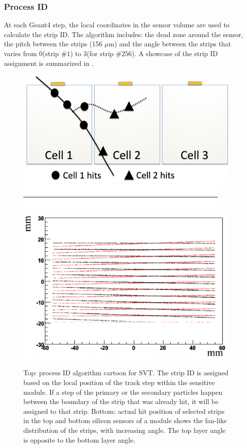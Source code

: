 \subsubsection{Process ID}

At each Geant4 step, the local coordinates in the sensor volume are used to calculate the strip ID.
The algorithm includes: the dead zone around the sensor, the pitch between the strips (156 $\mu$m) and the angle
between the strips that varies from 0\mdeg (strip $\# 1$) to 3\mdeg (for strip  $\# 256$). A showcase of the strip ID assignment
is summarized in .

\begin{figure}
	\centering
	\includegraphics[width=0.99\columnwidth,keepaspectratio]{img/bstHit.png}
	\includegraphics[width=0.99\columnwidth,keepaspectratio]{img/blank.png}
	\includegraphics[width=0.99\columnwidth,keepaspectratio]{img/bstStrip.png}
	\caption{Top: process ID algorithm cartoon for SVT. The strip ID is assigned based on the local position of the track
            step within the sensitive module. If a step of the primary or the secondary particles happen between the boundary
            of the strip that was already hit, it will be assigned to that strip. Bottom: actual hit position of selected
            strips in the top and bottom silicon sensors of a module shows the fan-like distribution of the strips,
            with increasing angle. The top layer angle is opposite to the bottom layer angle. }
	\label{fig:processID}
\end{figure}


